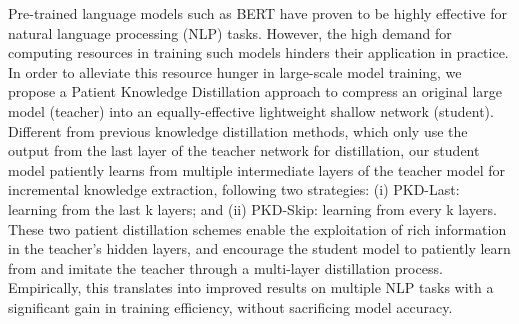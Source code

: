 Pre-trained language models such as BERT have proven to be highly effective for natural language processing (NLP) tasks. However, the high demand for computing resources in training such models hinders their application in practice. In order to alleviate this resource hunger in large-scale model training, we propose a Patient Knowledge Distillation approach to compress an original large model (teacher) into an equally-effective lightweight shallow network (student). Different from previous knowledge distillation methods, which only use the output from the last layer of the teacher network for distillation, our student model patiently learns from multiple intermediate layers of the teacher model for incremental knowledge extraction, following two strategies: (i) PKD-Last: learning from the last k layers; and (ii) PKD-Skip: learning from every k layers. These two patient distillation schemes enable the exploitation of rich information in the teacher's hidden layers, and encourage the student model to patiently learn from and imitate the teacher through a multi-layer distillation process. Empirically, this translates into improved results on multiple NLP tasks with a significant gain in training efficiency, without sacrificing model accuracy.